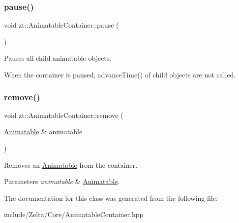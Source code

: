 \subsubsection{\texorpdfstring{pause()}{pause()}}
{\footnotesize\ttfamily void zt\+::\+Animatable\+Container\+::pause (\begin{DoxyParamCaption}{ }\end{DoxyParamCaption})}



Pauses all child animatable objects. 

When the container is paused, advance\+Time() of child objects are not called. \mbox{\label{classzt_1_1_animatable_container_ac6086455938dd4285bd6f7beca7d2eeb}} 
\subsubsection{\texorpdfstring{remove()}{remove()}}
{\footnotesize\ttfamily void zt\+::\+Animatable\+Container\+::remove (\begin{DoxyParamCaption}\item[{\hyperlink{classzt_1_1_animatable}{Animatable} \&}]{animatable }\end{DoxyParamCaption})}



Removes an \hyperlink{classzt_1_1_animatable}{Animatable} from the container. 


\begin{DoxyParams}{Parameters}
{\em animatable} & \hyperlink{classzt_1_1_animatable}{Animatable}. \\
\hline
\end{DoxyParams}


The documentation for this class was generated from the following file\+:\begin{DoxyCompactItemize}
\item 
include/\+Zelta/\+Core/Animatable\+Container.\+hpp\end{DoxyCompactItemize}
